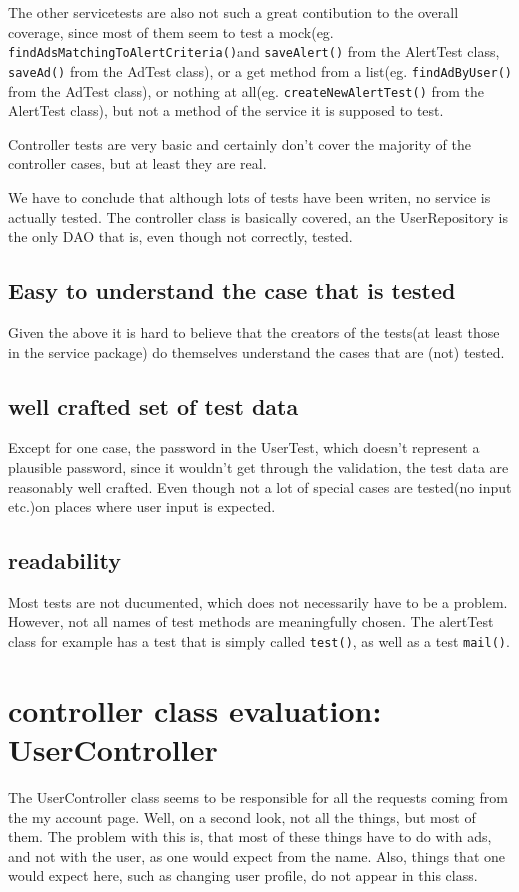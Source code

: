 \documentclass[a4wide]{article}
\begin{document}
The other servicetests are also not such a great contibution to the overall coverage, since most of them seem to test a mock(eg. \texttt{findAdsMatchingToAlertCriteria()}and \texttt{saveAlert()} from the AlertTest class, \texttt{saveAd()} from the AdTest class), or a get method from a list(eg. \texttt{findAdByUser()} from the AdTest class), or nothing at all(eg. \texttt{createNewAlertTest()} from the AlertTest class), but not a method of the service it is supposed to test. 

Controller tests are very basic and certainly don't cover the majority of the controller cases, but at least they are real. 

We have to conclude that although lots of tests have been writen, no service is actually tested. The controller class is basically covered, an the UserRepository is the only DAO that is, even though not correctly, tested. 
\subsection{Easy to understand the case that is tested}
Given the above it is hard to believe that the creators of the tests(at least those in the service package) do themselves understand the cases that are (not) tested. 
\subsection{well crafted set of test data}
Except for one case, the password in the UserTest, which doesn't represent a plausible password, since it wouldn't get through the validation, the test data are reasonably well crafted. Even though not a lot of special cases are tested(no input etc.)on places where user input is expected. 
\subsection{readability}
Most tests are not ducumented, which does not necessarily have to be a problem. However, not all names of test methods are meaningfully chosen. The alertTest class for example has a test that is simply called \texttt{test()}, as well as a test \texttt{mail()}. 
\section{controller class evaluation: UserController}
The UserController class seems to be responsible for all the requests coming from the my account page. 
Well, on a second look, not all the things, but most of them. The problem with this is, that most of these things have to do with ads, and not with the user, as one would expect from the name. Also, things that one would expect here, such as changing user profile, do not appear in this class. 
\end{document}
